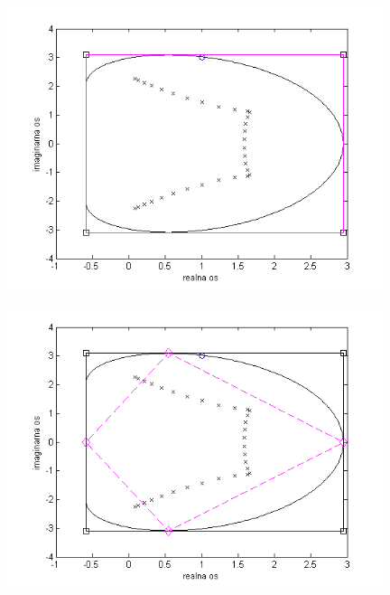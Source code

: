 \documentclass{beamer}
\begin{document}
\begin{frame}
\begin{center}
\includegraphics[width=11cm]{carden2.png}
\end{center}
\end{frame}
\begin{frame}
\begin{center}
\includegraphics[width=11cm]{carden3.png}
\end{center}
\end{frame}
\end{document}
